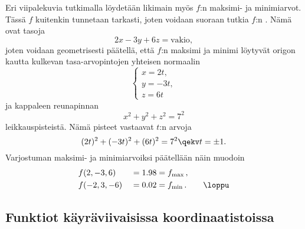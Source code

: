 Eri viipalekuvia tutkimalla löydetään likimain myös $f$:n maksimi- ja minimiarvot. Tässä
%
$f$ kuitenkin tunnetaan tarkasti, joten voidaan suoraan tutkia $f$:n .
Nämä ovat tasoja
\[
2x-3y+6z=\text{vakio},
\]
joten voidaan geometrisesti päätellä, että $f$:n maksimi ja minimi löytyvät origon kautta
kulkevan tasa-arvopintojen yhteisen normaalin
\[
\begin{cases} x=2t, \\ y=-3t, \\ z=6t \end{cases}
\]
ja kappaleen reunapinnan
\[
x^2+y^2+z^2=7^2
\]
leikkauspisteistä. Nämä pisteet vastaavat $t$:n arvoja
\[ 
(2t)^2+(-3t)^2+(6t)^2=7^2 \qekv t= \pm 1. 
\]
Varjostuman maksimi- ja minimiarvoiksi päätellään näin muodoin
\begin{alignat*}{3}
&f(2,-3,6)  &\ = 1.98 &= f_{\text{max}}\,, \\
&f(-2,3,-6) &\ = 0.02 &= f_{\text{min}}\,. \qquad\loppu
\end{alignat*}

\subsection{Funktiot käyräviivaisissa koordinaatistoissa} 

